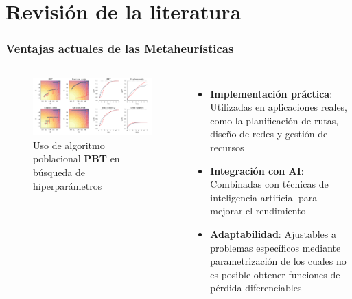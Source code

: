 \section{Revisión de la literatura}

\begin{frame}
  \frametitle{Ventajas actuales de las Metaheurísticas}
  \begin{columns}
    \begin{figure}
      \begin{center}
        \includegraphics[width=\textwidth]{imagenes/chapter3/pbt.png}
      \end{center}
      \caption{Uso de algoritmo poblacional \textbf{PBT} en búsqueda de hiperparámetros \footnotemark[3]}
    \end{figure}
    \begin{itemize}
      \item \textbf{Implementación práctica}: Utilizadas en aplicaciones reales, como la planificación de rutas, diseño de redes y gestión de recursos
      \item \textbf{Integración con AI}: Combinadas con técnicas de inteligencia artificial para mejorar el rendimiento
      \item \textbf{Adaptabilidad}: Ajustables a problemas específicos mediante parametrización de los cuales no es posible obtener funciones de pérdida diferenciables
    \end{itemize}
  \end{columns}
\end{frame}

\note{

}

